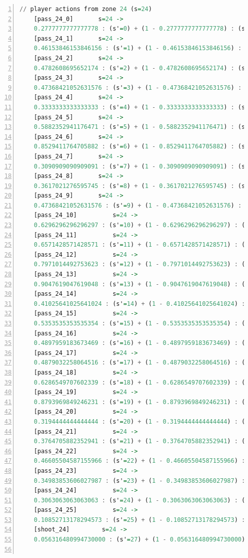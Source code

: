 \documentclass{l4proj}
\begin{document}
\begin{appendices}
\begin{lstlisting}[language=Haskell, numbers=left, caption=MDP used for strategy generation. This is the model specification as-is after the refinements at the end of chapter 3.]
	// player actions from zone 24 (s=24)
	[pass_24_0]	      s=24 ->
	0.2777777777777778 : (s'=0) + (1 - 0.2777777777777778) : (s'=26);
	[pass_24_1]	      s=24 ->
	0.46153846153846156 : (s'=1) + (1 - 0.46153846153846156) : (s'=26);
	[pass_24_2]	      s=24 ->
	0.4782608695652174 : (s'=2) + (1 - 0.4782608695652174) : (s'=26);
	[pass_24_3]	      s=24 ->
	0.47368421052631576 : (s'=3) + (1 - 0.47368421052631576) : (s'=26);
	[pass_24_4]	      s=24 ->
	0.3333333333333333 : (s'=4) + (1 - 0.3333333333333333) : (s'=26);
	[pass_24_5]	      s=24 ->
	0.5882352941176471 : (s'=5) + (1 - 0.5882352941176471) : (s'=26);
	[pass_24_6]	      s=24 ->
	0.8529411764705882 : (s'=6) + (1 - 0.8529411764705882) : (s'=26);
	[pass_24_7]	      s=24 ->
	0.3090909090909091 : (s'=7) + (1 - 0.3090909090909091) : (s'=26);
	[pass_24_8]	      s=24 ->
	0.3617021276595745 : (s'=8) + (1 - 0.3617021276595745) : (s'=26);
	[pass_24_9]	      s=24 ->
	0.47368421052631576 : (s'=9) + (1 - 0.47368421052631576) : (s'=26);
	[pass_24_10]	      s=24 ->
	0.6296296296296297 : (s'=10) + (1 - 0.6296296296296297) : (s'=26);
	[pass_24_11]	      s=24 ->
	0.6571428571428571 : (s'=11) + (1 - 0.6571428571428571) : (s'=26);
	[pass_24_12]	      s=24 ->
	0.7971014492753623 : (s'=12) + (1 - 0.7971014492753623) : (s'=26);
	[pass_24_13]	      s=24 ->
	0.9047619047619048 : (s'=13) + (1 - 0.9047619047619048) : (s'=26);
	[pass_24_14]	      s=24 ->
	0.41025641025641024 : (s'=14) + (1 - 0.41025641025641024) : (s'=26);
	[pass_24_15]	      s=24 ->
	0.5353535353535354 : (s'=15) + (1 - 0.5353535353535354) : (s'=26);
	[pass_24_16]	      s=24 ->
	0.4897959183673469 : (s'=16) + (1 - 0.4897959183673469) : (s'=26);
	[pass_24_17]	      s=24 ->
	0.4879032258064516 : (s'=17) + (1 - 0.4879032258064516) : (s'=26);
	[pass_24_18]	      s=24 ->
	0.6286549707602339 : (s'=18) + (1 - 0.6286549707602339) : (s'=26);
	[pass_24_19]	      s=24 ->
	0.8793969849246231 : (s'=19) + (1 - 0.8793969849246231) : (s'=26);
	[pass_24_20]	      s=24 ->
	0.3194444444444444 : (s'=20) + (1 - 0.3194444444444444) : (s'=26);
	[pass_24_21]	      s=24 ->
	0.3764705882352941 : (s'=21) + (1 - 0.3764705882352941) : (s'=26);
	[pass_24_22]	      s=24 ->
	0.46605504587155966 : (s'=22) + (1 - 0.46605504587155966) : (s'=26);
	[pass_24_23]	      s=24 ->
	0.34983853606027987 : (s'=23) + (1 - 0.34983853606027987) : (s'=26);
	[pass_24_24]	      s=24 ->
	0.3063063063063063 : (s'=24) + (1 - 0.3063063063063063) : (s'=26);
	[pass_24_25]	      s=24 ->
	0.10852713178294573 : (s'=25) + (1 - 0.10852713178294573) : (s'=26);
	[shoot_24]	       s=24 ->
	0.056316480994730000 : (s'=27) + (1 - 0.056316480994730000) : (s'=26);


\end{lstlisting}
\end{appendices}
\end{document}
